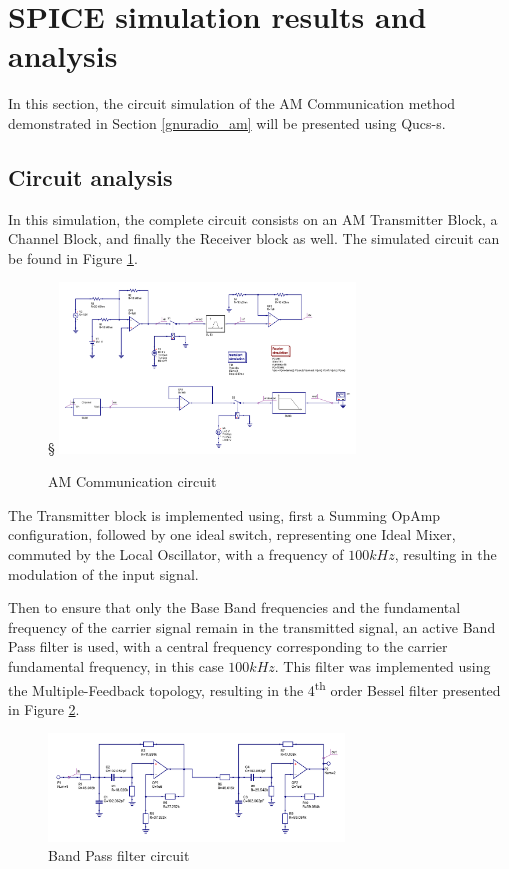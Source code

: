 \section{SPICE simulation results and analysis}

In this section, the circuit simulation of the AM Communication method demonstrated in Section \ref{gnuradio_am} will be presented using Qucs-s. 

\subsection{Circuit analysis}

In this simulation, the complete circuit consists on an AM Transmitter Block, a Channel Block, and finally the Receiver block as well. The simulated circuit can be found in Figure \ref{fig:Qucs_fullcircuit}.

\begin{figure}[H]§
    \centering
    \includegraphics*[width=0.7\textwidth]{Images/Qucs_fullcircuit.png}
    \caption{AM Communication circuit}
    \label{fig:Qucs_fullcircuit}
\end{figure}

The Transmitter block is implemented using, first a Summing OpAmp configuration, followed by one ideal switch, representing one Ideal Mixer, commuted by the Local Oscillator, with a frequency of $100 kHz$, resulting in the modulation of the input signal. 

Then to ensure that only the Base Band frequencies and the fundamental frequency of the carrier signal remain in the transmitted signal, an active Band Pass filter is used, with a central frequency corresponding to the carrier fundamental frequency, in this case $100 kHz$. This filter was implemented using the Multiple-Feedback topology, resulting in the 4\textsuperscript{th} order Bessel filter presented in Figure \ref{fig:Qucs_BPcircuit}.

\begin{figure}[H]
    \centering
    \includegraphics*[width=0.7\textwidth]{Images/Qucs_BPcircuit.png}
    \caption{Band Pass filter circuit}
    \label{fig:Qucs_BPcircuit}
\end{figure}


